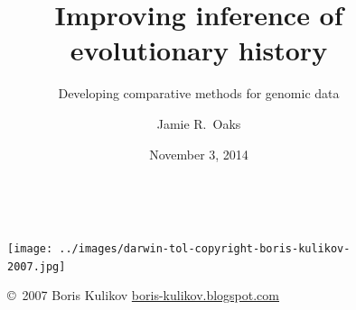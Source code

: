 

\newcommand{\allParameters}[1]{\ensuremath{\theta_{#1}}\xspace}


\title[Improving inference of evolutionary history]{Improving inference of evolutionary history}
\subtitle{Developing comparative methods for genomic data}

\author[J.\ Oaks]{
    Jamie R.\ Oaks
}

\date{November 3, 2014}


\begin{frame}
    \begin{columns}[c]
            \maketitle
            \begin{figure}
                \begin{center}
                \texttt{[image: ../images/darwin-tol-copyright-boris-kulikov-2007.jpg]}
                \caption{\tiny \copyright~2007 Boris Kulikov \href{http://boris-kulikov.blogspot.com/}{boris-kulikov.blogspot.com}}
                \end{center}
            \end{figure}
    \end{columns}
\end{frame}


